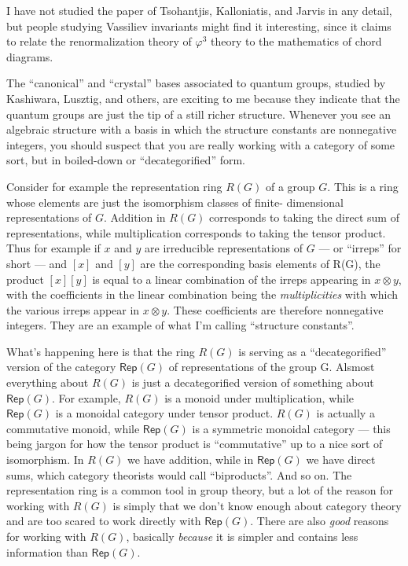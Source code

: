 \documentclass{article}
\def\tightlist{}
\renewcommand{\texttt}[1]{%
  \begingroup
  \ttfamily
  \begingroup\lccode`~=`/\lowercase{\endgroup\def~}{/\discretionary{}{}{}}%
  \begingroup\lccode`~=`[\lowercase{\endgroup\def~}{[\discretionary{}{}{}}%
  \begingroup\lccode`~=`.\lowercase{\endgroup\def~}{.\discretionary{}{}{}}%
  \catcode`/=\active\catcode`[=\active\catcode`.=\active
  \scantokens{#1\noexpand}%
  \endgroup
}
\begin{document}
I have not studied the paper of Tsohantjis, Kalloniatis, and Jarvis in
any detail, but people studying Vassiliev invariants might find it
interesting, since it claims to relate the renormalization theory of
\(\varphi^3\) theory to the mathematics of chord diagrams.


The ``canonical'' and ``crystal'' bases associated to quantum groups,
studied by Kashiwara, Lusztig, and others, are exciting to me because
they indicate that the quantum groups are just the tip of a still richer
structure. Whenever you see an algebraic structure with a basis in which
the structure constants are nonnegative integers, you should suspect
that you are really working with a category of some sort, but in
boiled-down or ``decategorified'' form.

Consider for example the representation ring \(R(G)\) of a group \(G\).
This is a ring whose elements are just the isomorphism classes of
finite- dimensional representations of \(G\). Addition in \(R(G)\)
corresponds to taking the direct sum of representations, while
multiplication corresponds to taking the tensor product. Thus for
example if \(x\) and \(y\) are irreducible representations of \(G\) ---
or ``irreps'' for short --- and \([x]\) and \([y]\) are the
corresponding basis elements of R(G), the product \([x][y]\) is equal to
a linear combination of the irreps appearing in \(x\otimes y\), with the
coefficients in the linear combination being the \emph{multiplicities}
with which the various irreps appear in \(x\otimes y\). These
coefficients are therefore nonnegative integers. They are an example of
what I'm calling ``structure constants''.

What's happening here is that the ring \(R(G)\) is serving as a
``decategorified'' version of the category \(\mathsf{Rep}(G)\) of
representations of the group G. Alsmost everything about \(R(G)\) is
just a decategorified version of something about \(\mathsf{Rep}(G)\).
For example, \(R(G)\) is a monoid under multiplication, while
\(\mathsf{Rep}(G)\) is a monoidal category under tensor product.
\(R(G)\) is actually a commutative monoid, while \(\mathsf{Rep}(G)\) is
a symmetric monoidal category --- this being jargon for how the tensor
product is ``commutative'' up to a nice sort of isomorphism. In \(R(G)\)
we have addition, while in \(\mathsf{Rep}(G)\) we have direct sums,
which category theorists would call ``biproducts''. And so on. The
representation ring is a common tool in group theory, but a lot of the
reason for working with \(R(G)\) is simply that we don't know enough
about category theory and are too scared to work directly with
\(\mathsf{Rep}(G)\). There are also \emph{good} reasons for working with
\(R(G)\), basically \emph{because} it is simpler and contains less
information than \(\mathsf{Rep}(G)\).
\end{document}
